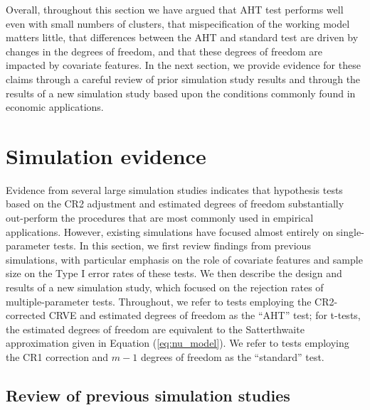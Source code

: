 \documentclass[12pt]{article}\usepackage[]{graphicx}\usepackage[]{color}
\begin{document}
Overall, throughout this section we have argued that AHT test performs well even with small numbers of clusters, that mispecification of the working model matters little, that differences between the AHT and standard test are driven by changes in the degrees of freedom, and that these degrees of freedom are impacted by covariate features.
In the next section, we provide evidence for these claims through a careful review of prior simulation study results and through the results of a new simulation study based upon the conditions commonly found in economic applications.

\section{Simulation evidence}
\label{sec:simulation}

Evidence from several large simulation studies indicates that hypothesis tests based on the CR2 adjustment and estimated degrees of freedom substantially out-perform the procedures that are most commonly used in empirical applications.
However, existing simulations have focused almost entirely on single-parameter tests. 
In this section, we first review findings from previous simulations, with particular emphasis on the role of covariate features and sample size on the Type I error rates of these tests.
We then describe the design and results of a new simulation study, which focused on the rejection rates of multiple-parameter tests.
  Throughout, we refer to tests employing the CR2-corrected CRVE and estimated degrees of freedom as the ``AHT'' test; for t-tests, the estimated degrees of freedom are equivalent to the Satterthwaite approximation given in Equation (\ref{eq:nu_model}). 
We refer to tests employing the CR1 correction and $m - 1$ degrees of freedom as the ``standard'' test. 

\subsection{Review of previous simulation studies}
\end{document}
